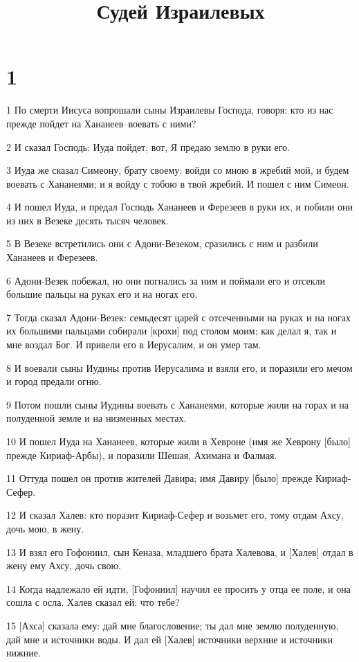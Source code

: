 

\title{Судей Израилевых}


\chapter{1}

\par 1 По смерти Иисуса вопрошали сыны Израилевы Господа, говоря: кто из нас прежде пойдет на Хананеев--воевать с ними?
\par 2 И сказал Господь: Иуда пойдет; вот, Я предаю землю в руки его.
\par 3 Иуда же сказал Симеону, брату своему: войди со мною в жребий мой, и будем воевать с Хананеями; и я войду с тобою в твой жребий. И пошел с ним Симеон.
\par 4 И пошел Иуда, и предал Господь Хананеев и Ферезеев в руки их, и побили они из них в Везеке десять тысяч человек.
\par 5 В Везеке встретились они с Адони-Везеком, сразились с ним и разбили Хананеев и Ферезеев.
\par 6 Адони-Везек побежал, но они погнались за ним и поймали его и отсекли большие пальцы на руках его и на ногах его.
\par 7 Тогда сказал Адони-Везек: семьдесят царей с отсеченными на руках и на ногах их большими пальцами собирали [крохи] под столом моим; как делал я, так и мне воздал Бог. И привели его в Иерусалим, и он умер там.
\par 8 И воевали сыны Иудины против Иерусалима и взяли его, и поразили его мечом и город предали огню.
\par 9 Потом пошли сыны Иудины воевать с Хананеями, которые жили на горах и на полуденной земле и на низменных местах.
\par 10 И пошел Иуда на Хананеев, которые жили в Хевроне (имя же Хеврону [было] прежде Кириаф-Арбы), и поразили Шешая, Ахимана и Фалмая.
\par 11 Оттуда пошел он против жителей Давира; имя Давиру [было] прежде Кириаф-Сефер.
\par 12 И сказал Халев: кто поразит Кириаф-Сефер и возьмет его, тому отдам Ахсу, дочь мою, в жену.
\par 13 И взял его Гофониил, сын Кеназа, младшего брата Халевова, и [Халев] отдал в жену ему Ахсу, дочь свою.
\par 14 Когда надлежало ей идти, [Гофониил] научил ее просить у отца ее поле, и она сошла с осла. Халев сказал ей: что тебе?
\par 15 [Ахса] сказала ему: дай мне благословение; ты дал мне землю полуденную, дай мне и источники воды. И дал ей [Халев] источники верхние и источники нижние.
